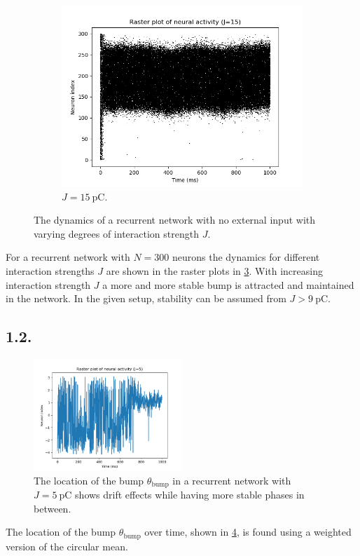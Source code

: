 \documentclass{article}
\begin{document}
\begin{figure}[h!]
\begin{subfigure}[b]{0.32\textwidth}
    \label{fig:J6}
  \end{subfigure}
  \hfill
  \begin{subfigure}[b]{0.32\textwidth}
    \includegraphics[width=\textwidth]{figures/1.1.raster_plot_J15.png}
    \caption{\(J=\qty{15}{\pico\coulomb}\).}
    \label{fig:J15}
  \end{subfigure}
  \caption{The dynamics of a recurrent network with no external input with varying degrees of interaction strength \(J\).}
  \label{fig:J}
\end{figure}

For a recurrent network with \(N=300\) neurons the dynamics for different interaction strengths \(J\) are shown in the raster plots in \cref{fig:J}. With increasing interaction strength \(J\) a more and more stable bump is attracted and maintained in the network. In the given setup, stability can be assumed from \(J>\qty{9}{\pico\coulomb}\).

\subsection*{1.2.}
\begin{figure}[h]
    \centering
    \includegraphics[width=0.5\textwidth]{figures/1.2.stability_plot_J5.png}
    \caption{The location of the bump \(\theta_\text{bump}\) in a recurrent network with \(J=\qty{5}{\pico\coulomb}\) shows drift effects while having more stable phases in between.}
    \label{fig:11}
\end{figure}
The location of the bump \(\theta_\text{bump}\) over time, shown in \cref{fig:11}, is found using a weighted version of the circular mean.
\end{document}
